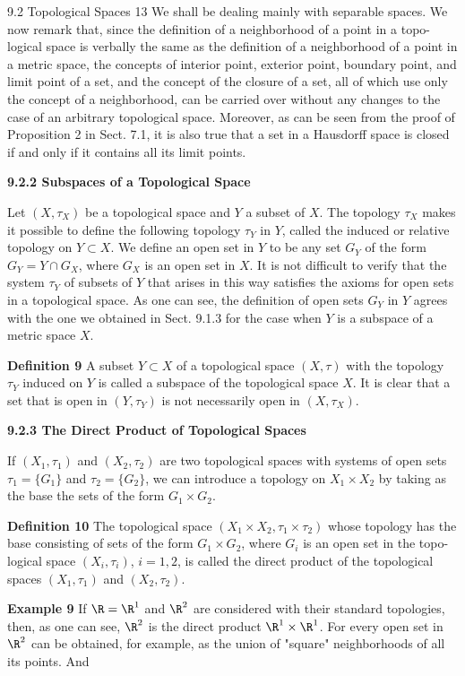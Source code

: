 9.2 Topological Spaces
\hfill 13
We shall be dealing mainly with separable spaces.
We now remark that, since the definition of a neighborhood of a point in a topo-
logical space is verbally the same as the definition of a neighborhood of a point in
a metric space, the concepts of interior point, exterior point, boundary point, and
limit point of a set, and the concept of the closure of a set, all of which use only the
concept of a neighborhood, can be carried over without any changes to the case of
an arbitrary topological space.
Moreover, as can be seen from the proof of Proposition 2 in Sect. 7.1, it is also
true that a set in a Hausdorff space is closed if and only if it contains all its limit
points.

\noindent
\textbf{9.2.2 Subspaces of a Topological Space}

Let $(X, \tau_X)$ be a topological space and $Y$ a subset of $X$. The topology $\tau_X$ makes
it possible to define the following topology $\tau_Y$ in $Y$, called the induced or relative
topology on $Y \subset X$.
We define an open set in $Y$ to be any set $G_Y$ of the form $G_Y = Y \cap G_X$, where
$G_X$ is an open set in $X$.
It is not difficult to verify that the system $\tau_Y$ of subsets of $Y$ that arises in this
way satisfies the axioms for open sets in a topological space.
As one can see, the definition of open sets $G_Y$ in $Y$ agrees with the one we
obtained in Sect. 9.1.3 for the case when $Y$ is a subspace of a metric space $X$.

\noindent
\textbf{Definition 9} A subset $Y \subset X$ of a topological space $(X, \tau)$ with the topology $\tau_Y$
induced on $Y$ is called a subspace of the topological space $X$.
It is clear that a set that is open in $(Y, \tau_Y)$ is not necessarily open in $(X, \tau_X)$.

\noindent
\textbf{9.2.3 The Direct Product of Topological Spaces}

If $(X_1, \tau_1)$ and $(X_2, \tau_2)$ are two topological spaces with systems of open sets $\tau_1 =
\{G_1\}$ and $\tau_2 = \{G_2\}$, we can introduce a topology on $X_1 \times X_2$ by taking as the base
the sets of the form $G_1 \times G_2$.

\noindent
\textbf{Definition 10} The topological space $(X_1 \times X_2, \tau_1 \times \tau_2)$ whose topology has the
base consisting of sets of the form $G_1 \times G_2$, where $G_i$ is an open set in the topo-
logical space $(X_i, \tau_i)$, $i = 1, 2$, is called the direct product of the topological spaces
$(X_1, \tau_1)$ and $(X_2, \tau_2)$.

\noindent
\textbf{Example 9} If $\R = \R^1$ and $\R^2$ are considered with their standard topologies, then,
as one can see, $\R^2$ is the direct product $\R^1 \times \R^1$. For every open set in $\R^2$ can be
obtained, for example, as the union of "square" neighborhoods of all its points. And